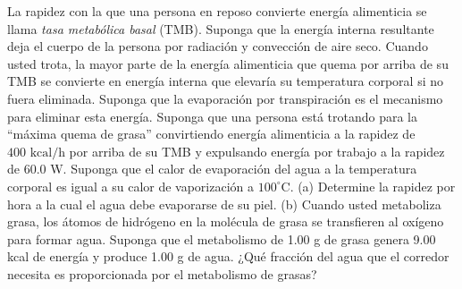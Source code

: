 \item La rapidez con la que una persona en reposo convierte energía alimenticia se llama \textit{tasa metabólica basal} (TMB). Suponga que la energía interna resultante deja el cuerpo de la persona por radiación y convección de aire seco. Cuando usted trota, la mayor parte de la energía alimenticia que quema por arriba de su TMB se convierte en energía interna que elevaría su temperatura corporal si no fuera eliminada. Suponga que la evaporación por transpiración es el mecanismo para eliminar esta energía. Suponga que una persona está trotando para la “máxima quema de grasa” convirtiendo energía alimenticia a la rapidez de $400\text{ kcal/h}$ por arriba de su TMB y expulsando energía por trabajo a la rapidez de 60.0 W. Suponga que el calor de evaporación del agua a la temperatura corporal es igual a su calor de vaporización a $100^\circ\text{C}$. (a) Determine la rapidez por hora a la cual el agua debe evaporarse de su piel. (b) Cuando usted metaboliza grasa, los átomos de hidrógeno en la molécula de grasa se transfieren al oxígeno para formar agua. Suponga que el metabolismo de 1.00 g de grasa genera 9.00 kcal de energía y produce 1.00 g de agua. ¿Qué fracción del agua que el corredor necesita es proporcionada por el metabolismo de grasas?
